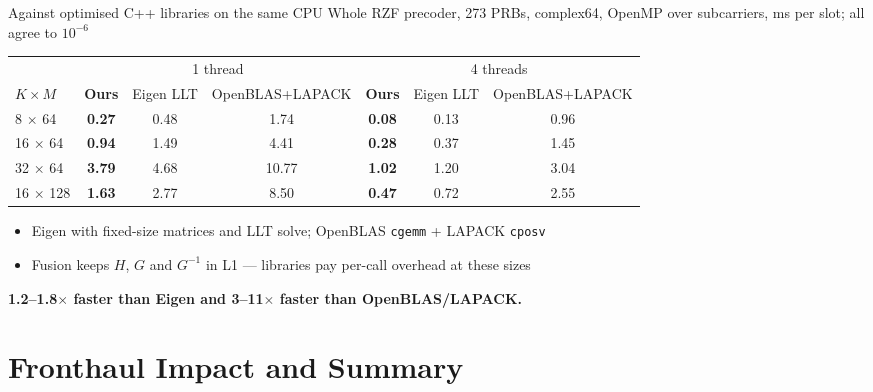 \documentclass[aspectratio=169,11pt,xcolor=table]{beamer}
\newcommand{\best}[1]{\textbf{\textcolor{good}{#1}}}
\newcommand{\takeaway}[1]{%
  \vfill
  \begin{alertblock}{}\centering\textbf{#1}\end{alertblock}}
\begin{document}
\begin{frame}{Against optimised C++ libraries on the same CPU}
  \centering
  \small Whole RZF precoder, 273 PRBs, complex64, OpenMP over subcarriers, ms per slot; all agree to $10^{-6}$\\[2mm]
  \scriptsize\setlength{\tabcolsep}{3pt}
  \begin{tabular}{lcccccc}
    \toprule
    & \multicolumn{3}{c}{1 thread} & \multicolumn{3}{c}{4 threads} \\
    \cmidrule(lr){2-4}\cmidrule(lr){5-7}
    $K\times M$ & \textbf{Ours} & Eigen LLT & OpenBLAS+LAPACK & \textbf{Ours} & Eigen LLT & OpenBLAS+LAPACK \\
    \midrule
    8 $\times$ 64 & \best{0.27} & 0.48 & 1.74 & \best{0.08} & 0.13 & 0.96 \\
    16 $\times$ 64 & \best{0.94} & 1.49 & 4.41 & \best{0.28} & 0.37 & 1.45 \\
    32 $\times$ 64 & \best{3.79} & 4.68 & 10.77 & \best{1.02} & 1.20 & 3.04 \\
    16 $\times$ 128 & \best{1.63} & 2.77 & 8.50 & \best{0.47} & 0.72 & 2.55 \\
    \bottomrule
  \end{tabular}
  \vspace{2mm}
  \begin{itemize}\small
    \item Eigen with fixed-size matrices and LLT solve; OpenBLAS \texttt{cgemm} + LAPACK \texttt{cposv}
    \item Fusion keeps $H$, $G$ and $G^{-1}$ in L1 --- libraries pay per-call overhead at these sizes
  \end{itemize}
  \takeaway{1.2--1.8$\times$ faster than Eigen and 3--11$\times$ faster than OpenBLAS/LAPACK.}
\end{frame}

\section{Fronthaul Impact and Summary}
\end{document}
